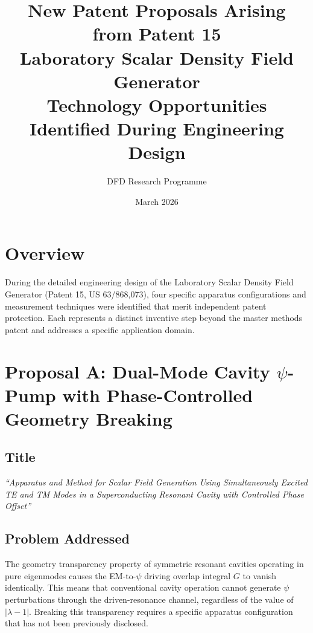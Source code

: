 \documentclass[11pt,a4paper]{article}
\title{\textbf{New Patent Proposals Arising from Patent 15}\\[6pt]
\large Laboratory Scalar Density Field Generator\\
\normalsize Technology Opportunities Identified During
Engineering Design}
\author{DFD Research Programme}
\date{March 2026}
\begin{document}
\maketitle
\tableofcontents
\newpage

\section{Overview}

During the detailed engineering design of the Laboratory Scalar
Density Field Generator (Patent 15, US 63/868,073), four specific
apparatus configurations and measurement techniques were identified
that merit independent patent protection.  Each represents a
distinct inventive step beyond the master methods patent and
addresses a specific application domain.

\section{Proposal A: Dual-Mode Cavity $\psi$-Pump with
Phase-Controlled Geometry Breaking}

\subsection{Title}

\textit{``Apparatus and Method for Scalar Field Generation Using
Simultaneously Excited TE and TM Modes in a Superconducting
Resonant Cavity with Controlled Phase Offset''}

\subsection{Problem Addressed}

The geometry transparency property of symmetric resonant cavities
operating in pure eigenmodes causes the EM-to-$\psi$ driving
overlap integral $G$ to vanish identically.  This means that
conventional cavity operation cannot generate $\psi$ perturbations
through the driven-resonance channel, regardless of the value of
$|\lambda - 1|$.  Breaking this transparency requires a specific
apparatus configuration that has not been previously disclosed.
\end{document}
